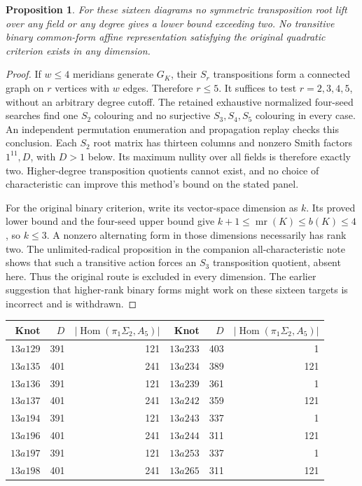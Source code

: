 \documentclass[11pt]{article}
\newtheorem{proposition}[theorem]{Proposition}
\newcommand{\mr}{\operatorname{mr}}
\newcommand{\Hom}{\operatorname{Hom}}
\begin{document}
\begin{proposition}\label{prop:all}
For these sixteen diagrams no symmetric transposition root lift over
any field or any degree gives a lower bound exceeding two. No
transitive binary common-form affine representation satisfying the
original quadratic criterion exists in any dimension.
\end{proposition}
\begin{proof}
If $w\le4$ meridians generate $G_K$, their $S_r$ transpositions form
a connected graph on $r$ vertices with $w$ edges. Therefore $r\le5$.
It suffices to test $r=2,3,4,5$, without an arbitrary degree cutoff.
The retained exhaustive normalized four-seed searches find one $S_2$
colouring and no surjective $S_3,S_4,S_5$ colouring in every case.
An independent permutation enumeration and propagation replay checks
this conclusion. Each $S_2$ root matrix has thirteen columns and
nonzero Smith factors $1^{11},D$, with $D>1$ below. Its maximum
nullity over all fields is therefore exactly two. Higher-degree
transposition quotients cannot exist, and no choice of characteristic
can improve this method's bound on the stated panel.

For the original binary criterion, write its vector-space dimension
as $k$. Its proved lower bound and the four-seed upper bound give
$k+1\le\mr(K)\le b(K)\le4$, so $k\le3$. A nonzero alternating form
in those dimensions necessarily has rank two. The unlimited-radical
proposition in the companion all-characteristic note shows that such
a transitive action forces an $S_3$ transposition quotient, absent
here. Thus the original route is excluded in every dimension. The
earlier suggestion that higher-rank binary forms might work on these
sixteen targets is incorrect and is withdrawn.
\end{proof}

\begin{center}
\begin{tabular}{rrrrrr}
\toprule
Knot & $D$ & $|\Hom(\pi_1\Sigma_2,A_5)|$ &
Knot & $D$ & $|\Hom(\pi_1\Sigma_2,A_5)|$\\
\midrule
$13a129$&391&121&$13a233$&403&1\\
$13a135$&401&241&$13a234$&389&121\\
$13a136$&391&121&$13a239$&361&1\\
$13a137$&401&241&$13a242$&359&121\\
$13a194$&391&121&$13a243$&337&1\\
$13a196$&401&241&$13a244$&311&121\\
$13a197$&391&121&$13a253$&337&1\\
$13a198$&401&241&$13a265$&311&121\\
\bottomrule
\end{tabular}
\end{center}
\end{document}
